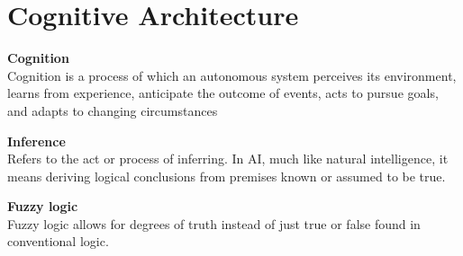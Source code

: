 \section{Cognitive Architecture}

\textbf{Cognition} \\
Cognition is a process of which an autonomous system perceives its environment, learns from experience, anticipate the outcome of events, acts to pursue goals, and adapts to changing circumstances

\textbf{Inference} \\
Refers to the act or process of inferring. In AI, much like natural intelligence, it means deriving logical conclusions from premises known or assumed to be true. 

\textbf{Fuzzy logic} \\
Fuzzy logic allows for degrees of truth instead of just true or false found in conventional logic.
